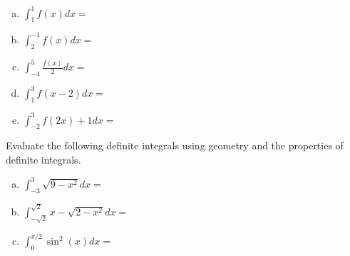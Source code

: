 \documentclass[answers]{exam}
\begin{document}
\begin{questions}
\begin{enumerate}[(a)]
			\hfill \break
			
			\item $\displaystyle \int_{1}^{1} f(x) dx = $\\
			
			\hfill \break
			
			\item $\displaystyle \int_{2}^{-1} f(x) dx = $\\
			
			\hfill \break
			
			\item $\displaystyle \int_{-4}^{5} \frac{f(x)}{2} dx = $\\
			
			\hfill \break
			
			\item $\displaystyle \int_{1}^{3} f(x-2) dx = $\\
			
			\hfill \break
			
			\item $\displaystyle \int_{-2}^{3} f(2x)+1 dx = $\\
			
			
		\end{enumerate}
		
		\question Evaluate the following definite integrals using geometry and the properties of definite integrals.
		
		\begin{enumerate}[(a)]
			
			\item $\displaystyle \int_{-3}^{3} \sqrt{9-x^2} dx = $\\
			
			\hfill \break
			\hfill \break
			\hfill \break
			\hfill \break
			
			\item $\displaystyle \int_{-\sqrt{2}}^{\sqrt{2}} x-\sqrt{2-x^2} dx = $\\
			
			\hfill \break
			\hfill \break
			\hfill \break
			\hfill \break
			\hfill \break
			\hfill \break
			\hfill \break
			\hfill \break
			
			\item $\displaystyle \int_{0}^{\pi/2} \sin^2(x) dx = $\\
		\end{enumerate}
		
	
	\end{questions}
	
	
	
\end{document}
